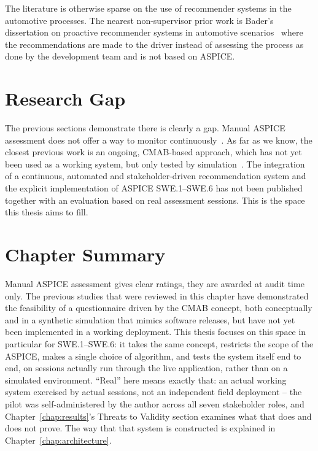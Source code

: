 \documentclass[a4paper, 12pt, oneside, openany, BCOR1cm,toc=chapterentrywithdots]{scrbook}
\begin{document}
The literature is otherwise sparse on the use of recommender systems in the automotive
processes. The nearest non-supervisor prior work is Bader's dissertation on proactive
recommender systems in automotive scenarios~\cite{bader2013proactive} where the recommendations
are made to the driver instead of assessing the process as done by the development team and is
not based on ASPICE.

\section{Research Gap}

The previous sections demonstrate there is clearly a gap. Manual ASPICE assessment does not
offer a way to monitor continuously~\cite{datsogiannis2024early}. As far as we know, the closest
previous work is an ongoing, CMAB-based approach, which has not yet been used as a working
system, but only tested by
simulation~\cite{datsogiannis2024early,datsogiannis2025recommender}. The integration of a
continuous, automated and stakeholder-driven recommendation system and the explicit
implementation of ASPICE SWE.1--SWE.6 has not been published together with an evaluation based
on real assessment sessions. This is the space this thesis aims to fill.

\section{Chapter Summary}

Manual ASPICE assessment gives clear ratings, they are awarded at audit time only. The previous
studies that were reviewed in this chapter have demonstrated the feasibility of a questionnaire
driven by the CMAB concept, both conceptually and in a synthetic simulation that mimics software
releases, but have not yet been implemented in a working deployment. This thesis focuses on this
space in particular for SWE.1--SWE.6: it takes the same concept, restricts the scope of the
ASPICE, makes a single choice of algorithm, and tests the system itself end to end, on sessions
actually run through the live application, rather than on a simulated environment. ``Real'' here
means exactly that: an actual working system exercised by actual sessions, not an independent
field deployment -- the pilot was self-administered by the author across all seven stakeholder
roles, and Chapter~\ref{chap:results}'s Threats to Validity section examines what that does and
does not prove. The way that that system is constructed is explained in
Chapter~\ref{chap:architecture}.
\end{document}
